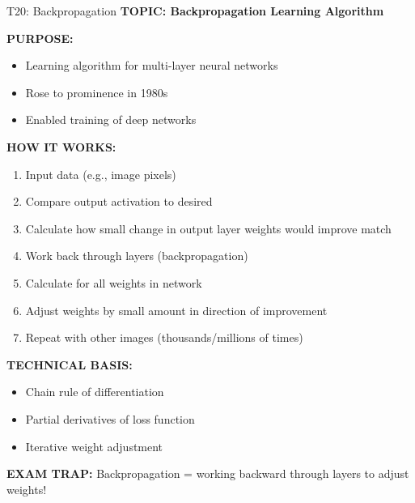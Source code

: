 \documentclass[8pt]{beamer}
\begin{document}
	\begin{frame}{T20: Backpropagation}
		\fontsize{6.5}{7.5}\selectfont
		\textbf{TOPIC: Backpropagation Learning Algorithm}
		
		\vspace{0.1cm}
		\textbf{PURPOSE:}
		\begin{itemize}
			\item Learning algorithm for multi-layer neural networks
			\item Rose to prominence in 1980s
			\item Enabled training of deep networks
		\end{itemize}
		
		\vspace{0.1cm}
		\textbf{HOW IT WORKS:}
		\begin{enumerate}
			\item Input data (e.g., image pixels)
			\item Compare output activation to desired
			\item Calculate how small change in output layer weights would improve match
			\item Work back through layers (backpropagation)
			\item Calculate for all weights in network
			\item Adjust weights by small amount in direction of improvement
			\item Repeat with other images (thousands/millions of times)
		\end{enumerate}
		
		\vspace{0.1cm}
		\textbf{TECHNICAL BASIS:}
		\begin{itemize}
			\item Chain rule of differentiation
			\item Partial derivatives of loss function
			\item Iterative weight adjustment
		\end{itemize}
		
		\textcolor{myred}{\textbf{EXAM TRAP:}} Backpropagation = \textcolor{myblue}{working backward through layers} to adjust weights!
	\end{frame}
	
\end{document}
